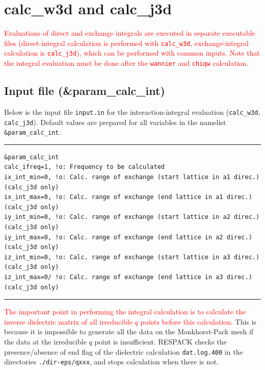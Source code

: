 \documentclass{article}
\newcommand{\tr}[1]{\textcolor{red}{#1}}
\begin{document}
\clearpage 

\section{calc\_w3d and calc\_j3d}
\tr{Evaluations of direct and exchange integrals are executed in separate executable files (direct-integral calculation is performed with {\tt calc\_w3d}, exchange-integral calculation is {\tt calc\_j3d}), which can be performed with common inputs. Note that the integral evaluation must be done after the {\tt wannier} and {\tt chiqw} calculation.} 

\subsection{\label{input-calc-int}Input file (\&param\_calc\_int)}
Below is the input file \verb+input.in+ for the interaction-integral evaluation (\verb+calc_w3d+, \verb+calc_j3d+). Default values are prepared for all variables in the namelist \verb+&param_calc_int+.
\vspace{3mm}\hrule
\begin{verbatim}
&param_calc_int 
calc_ifreq=1, !o: Frequency to be calculated
ix_int_min=0, !o: Calc. range of exchange (start lattice in a1 direc.) (calc_j3d only)
ix_int_max=0, !o: Calc. range of exchange (end lattice in a1 direc.) (calc_j3d only)
iy_int_min=0, !o: Calc. range of exchange (start lattice in a2 direc.) (calc_j3d only)
iy_int_max=0, !o: Calc. range of exchange (end lattice in a2 direc.) (calc_j3d only)
iz_int_min=0, !o: Calc. range of exchange (start lattice in a3 direc.) (calc_j3d only)
iz_int_max=0/ !o: Calc. range of exchange (end lattice in a3 direc.) (calc_j3d only)
\end{verbatim}
\hrule\vspace{3mm}
\tr{The important point in performing the integral calculation is to calculate the inverse dielectric matrix of all irreducible $q$ points before this calculation.} This is because it is impossible to generate all the data on the Monkhorst-Pack mesh if the data at the irreducible $q$ point is insufficient. RESPACK checks the presence/absence of end flag of the dielectric calculation \verb+dat.log.400+ in the directories  \verb+./dir-eps/qxxx+, and stops calculation when there is not.
\end{document}
